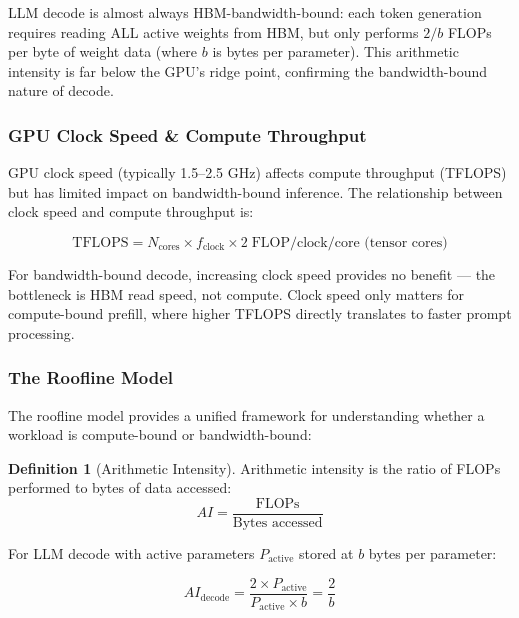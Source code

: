 \documentclass[11pt,a4paper]{article}
\theoremstyle{definition}
\newtheorem{definition}{Definition}[section]
\begin{document}
LLM decode is almost always HBM-bandwidth-bound: each token generation requires reading ALL active weights from HBM, but only performs $2/b$ FLOPs per byte of weight data (where $b$ is bytes per parameter). This arithmetic intensity is far below the GPU's ridge point, confirming the bandwidth-bound nature of decode.

\subsubsection{GPU Clock Speed \& Compute Throughput}

GPU clock speed (typically 1.5--2.5 GHz) affects compute throughput (TFLOPS) but has limited impact on bandwidth-bound inference. The relationship between clock speed and compute throughput is:

\begin{equation}\label{eq:tflops}
\text{TFLOPS} = N_{\text{cores}} \times f_{\text{clock}} \times 2 \;\text{FLOP/clock/core (tensor cores)}
\end{equation}

For bandwidth-bound decode, increasing clock speed provides no benefit --- the bottleneck is HBM read speed, not compute. Clock speed only matters for compute-bound prefill, where higher TFLOPS directly translates to faster prompt processing.

\subsubsection{The Roofline Model}

The roofline model provides a unified framework for understanding whether a workload is compute-bound or bandwidth-bound:

\begin{definition}[Arithmetic Intensity]
Arithmetic intensity is the ratio of FLOPs performed to bytes of data accessed:
\begin{equation}\label{eq:arithint}
AI = \frac{\text{FLOPs}}{\text{Bytes accessed}}
\end{equation}
\end{definition}

For LLM decode with active parameters $P_{\text{active}}$ stored at $b$ bytes per parameter:

\begin{equation}\label{eq:decode_ai}
AI_{\text{decode}} = \frac{2 \times P_{\text{active}}}{P_{\text{active}} \times b} = \frac{2}{b}
\end{equation}
\end{document}
